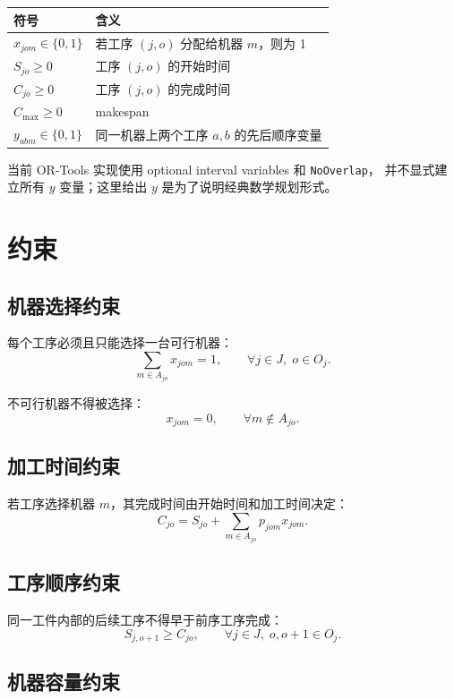 ﻿\documentclass[11pt]{ctexart}
\begin{document}
\begin{table}[h]
\centering
\begin{tabular}{ll}
\toprule
符号 & 含义 \\
\midrule
$x_{jom} \in \{0,1\}$ & 若工序 $(j,o)$ 分配给机器 $m$，则为 1 \\
$S_{jo} \ge 0$ & 工序 $(j,o)$ 的开始时间 \\
$C_{jo} \ge 0$ & 工序 $(j,o)$ 的完成时间 \\
$C_{\max} \ge 0$ & makespan \\
$y_{abm} \in \{0,1\}$ & 同一机器上两个工序 $a,b$ 的先后顺序变量 \\
\bottomrule
\end{tabular}
\end{table}

当前 OR-Tools 实现使用 optional interval variables 和 \texttt{NoOverlap}，
并不显式建立所有 $y$ 变量；这里给出 $y$ 是为了说明经典数学规划形式。

\section{约束}

\subsection{机器选择约束}

每个工序必须且只能选择一台可行机器：
\[
\sum_{m \in A_{jo}} x_{jom} = 1,
\qquad \forall j \in J,\; o \in O_j.
\]

不可行机器不得被选择：
\[
x_{jom}=0,
\qquad \forall m \notin A_{jo}.
\]

\subsection{加工时间约束}

若工序选择机器 $m$，其完成时间由开始时间和加工时间决定：
\[
C_{jo} = S_{jo} + \sum_{m \in A_{jo}} p_{jom}x_{jom}.
\]

\subsection{工序顺序约束}

同一工件内部的后续工序不得早于前序工序完成：
\[
S_{j,o+1} \ge C_{jo},
\qquad \forall j \in J,\; o,o+1 \in O_j.
\]

\subsection{机器容量约束}
\end{document}
